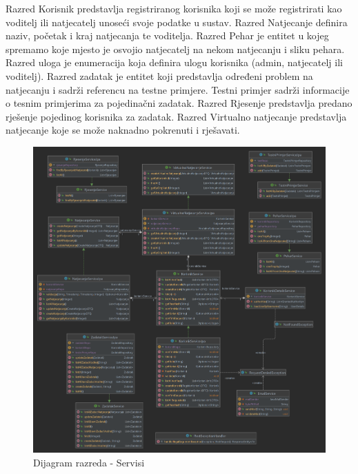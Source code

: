 Razred Korisnik predstavlja registriranog korisnika koji se može registrirati kao voditelj ili natjecatelj unoseći svoje podatke u sustav.
Razred Natjecanje definira naziv, početak i kraj natjecanja te voditelja. Razred Pehar je entitet u kojeg spremamo koje mjesto je osvojio natjecatelj na nekom natjecanju i sliku pehara.
Razred uloga je enumeracija koja definira ulogu korisnika (admin, natjecatelj ili voditelj). Razred zadatak je entitet koji predstavlja određeni problem na natjecanju i sadrži referencu na testne primjere.
Testni primjer sadrži informacije o tesnim primjerima za pojedinačni zadatak. Razred Rjesenje predstavlja predano rješenje pojedinog korisnika za zadatak. 
Razred Virtualno natjecanje predstavlja natjecanje koje se može naknadno pokrenuti i rješavati. 

\begin{figure}[H]
	\includegraphics[scale=0.19]{dijagrami/serviceDiagram.png}
	\centering
	\caption{Dijagram razreda - Servisi}
\end{figure}


